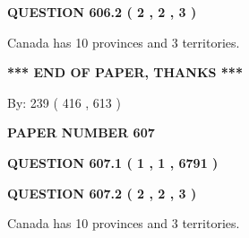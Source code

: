 \documentclass[12pt]{article}
\begin{document}
  
  
\vspace{0.2in}
  
{\textbf{\Large{QUESTION
606.2 
 ( 2 , 2 , 3 )
}}}
  
  
 
 
\noindent{}
 
 
Canada has 10  provinces and 3 territories.
 
 
 
 
   
   
 \vspace{0.2in}
 
   
   
   
   
\vspace{1.0in} 
{\textbf{\large{ *** END OF PAPER, THANKS *** }}} 
   
   
\hspace{1.0in} By: 
 239 ( 416 ,  613 )
   
   
   
   
\newpage 
\setcounter{page}{ 
   607001 } 
   
   
   
   
 {\textbf{ \Large{ PAPER NUMBER  607  }}}
   
   
\vspace{0.2in}
   
   
   
   
   
   
 \vspace{0.2in}
 
 
 
 
   
   
  
\vspace{0.2in}
  
{\textbf{\Large{QUESTION
607.1 
 ( 1 , 1 , 6791 )
}}}
  
  
  
\vspace{0.2in}
  
{\textbf{\Large{QUESTION
607.2 
 ( 2 , 2 , 3 )
}}}
  
  
 
 
\noindent{}
 
 
Canada has 10  provinces and 3 territories.
 
\end{document}
